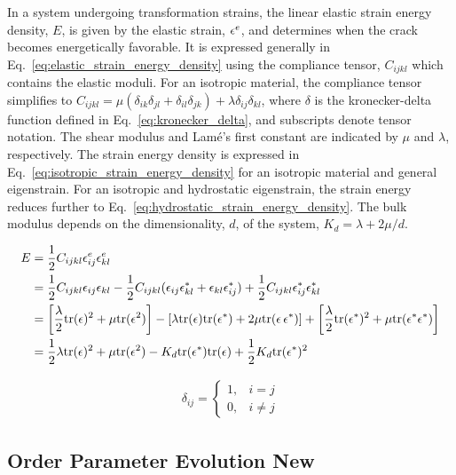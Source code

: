 In a system undergoing transformation strains, the linear elastic strain energy density, $E$, is given by the elastic strain, $\epsilon^e$, and determines when the crack becomes energetically favorable. It is expressed generally in Eq.~\ref{eq:elastic_strain_energy_density} using the compliance tensor, $C_{ijkl}$ which contains the elastic moduli. For an isotropic material, the compliance tensor simplifies to $C_{ijkl}=\mu(\delta_{ik}\delta_{jl} + \delta_{il}\delta_{jk}) + \lambda \delta_{ij}\delta_{kl}$, where $\delta$ is the kronecker-delta function defined in Eq.~\ref{eq:kronecker_delta}, and subscripts denote tensor notation. The shear modulus and Lam\'e's first constant are indicated by $\mu$ and $\lambda$, respectively.  The strain energy density is expressed in Eq.~\ref{eq:isotropic_strain_energy_density} for an isotropic material and general eigenstrain. For an isotropic and hydrostatic eigenstrain, the strain energy reduces further to Eq.~\ref{eq:hydrostatic_strain_energy_density}. The bulk modulus depends on the dimensionality, $d$, of the system, $K_d = \lambda+2\mu/d$.


\begin{align}
    E &= \frac{1}{2} C_{ijkl} \epsilon^e_{ij}\epsilon^e_{kl}	 \label{eq:elastic_strain_energy_density}\\
	&= \frac{1}{2} C_{ijkl}\epsilon_{ij}\epsilon_{kl} - \frac{1}{2} C_{ijkl}(\epsilon_{ij}\epsilon^*_{kl} + \epsilon_{kl}\epsilon^*_{ij}) + \frac{1}{2} C_{ijkl}\epsilon^*_{ij}\epsilon^*_{kl} \notag\\
	&=\left[\frac{\lambda}{2} \text{tr}(\epsilon)^2 + \mu \text{tr}(\epsilon^2)\right]- \left[ \lambda \text{tr}(\epsilon)\text{tr}(\epsilon^*) + 2\mu\text{tr}(\epsilon\,\epsilon^*) \right] + \left[\frac{\lambda}{2} \text{tr}(\epsilon^*)^2 + \mu \text{tr}(\epsilon^*\epsilon^*)\right]\label{eq:isotropic_strain_energy_density}\\
	&= 	\frac{1}{2} \lambda \text{tr}(\epsilon)^2 + \mu\text{tr}(\epsilon^2) - K_d \text{tr}(\epsilon^*)\text{tr}(\epsilon) + \frac{1}{2}K_d \text{tr}(\epsilon^*)^2\label{eq:hydrostatic_strain_energy_density}
\end{align}

\begin{align} \label{eq:kronecker_delta}
	\delta_{ij} =
	\begin{cases}
		1, & i=j\\
		0, & i\ne j
	\end{cases}
\end{align}




\subsection{Order Parameter Evolution New}

